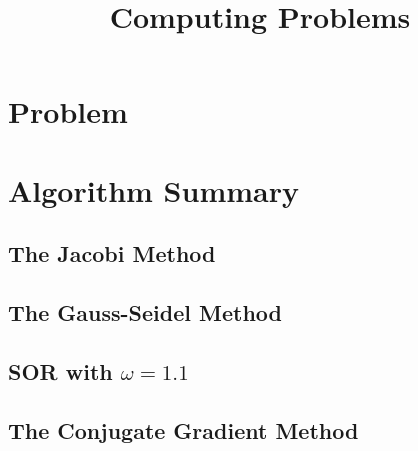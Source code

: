 \documentclass{ExpReport}
\author{} %
\title{Computing Problems} %
\begin{document}
    \begingroup
    \renewcommand\arraystretch{1.65}
    \maketitle
    \endgroup
    \setlength{\baselineskip}{15pt} %
    

\section{Problem}



\section{Algorithm Summary}
    


\subsection{The Jacobi Method}



\subsection{The Gauss-Seidel Method}



\subsection{SOR with $\omega = 1.1$}



\subsection{The Conjugate Gradient Method}
\end{document}
